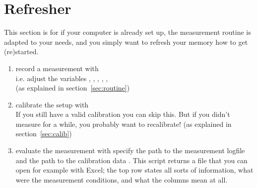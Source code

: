 \section{Refresher}

This section is for
if your computer is already set up,
the measurement routine
is adapted to your needs,
and you simply want to refresh
your memory how to get (re)started.

\begin{enumerate}
  \item record a measurement with  \\
         i.e. adjust the variables , 
         , ,
         , ,
          \\
         (as explained in section~\ref{sec:routine})
  \item calibrate the setup with  \\
         If you still have a valid calibration you can skip this.
         But if you didn't measure for a while, you probably want to recalibrate!
         (as explained in section~\ref{sec:calib})
  \item evaluate the measurement with 
         specify the path to the measurement logfile 
         and the path to the calibration data .
         This script returns a file that you can open for example with Excel;
         the top row states all sorts of information,
         what were the measurement conditions,
         and what the columns mean at all.
\end{enumerate}

